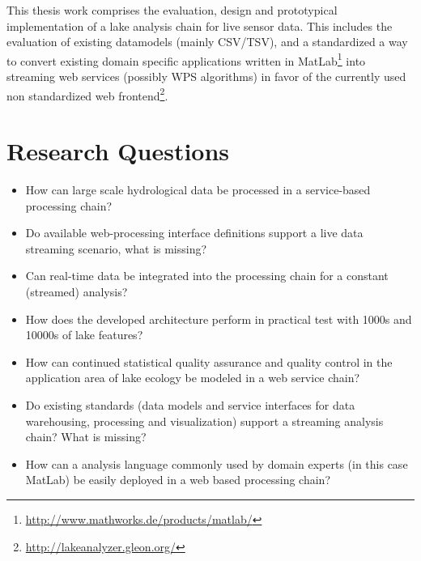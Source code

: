 \documentclass[paper=a4,fontsize=11pt]{scrartcl}
\newcommand{\fu}[1]{\footnote{\url{#1}}}
\begin{document}
    This thesis work comprises the evaluation, design and prototypical implementation of a lake analysis chain for live sensor data.
    This includes the evaluation of existing datamodels (mainly CSV/TSV), and a standardized a way to convert existing domain specific applications written in MatLab\fu{http://www.mathworks.de/products/matlab/} into streaming web services (possibly WPS algorithms) in favor of the currently used non standardized web frontend\fu{http://lakeanalyzer.gleon.org/}.

    \section*{Research Questions}
    \begin{itemize}
        \item How can large scale hydrological data be processed in a service-based processing chain?
        \item Do available web-processing interface definitions support a live data streaming scenario, what is missing?
        \item Can real-time data be integrated into the processing chain for a constant (streamed) analysis?
        \item How does the developed architecture perform in practical test with 1000s and 10000s of lake features?
        \item How can continued statistical quality assurance and quality control in the application area of lake ecology be modeled in a web service chain?
        \item Do existing standards (data models and service interfaces for data warehousing, processing and visualization) support a streaming analysis chain? What is missing?
        \item How can a analysis language commonly used by domain experts (in this case MatLab) be easily deployed in a web based processing chain?
    \end{itemize}
\end{document}
